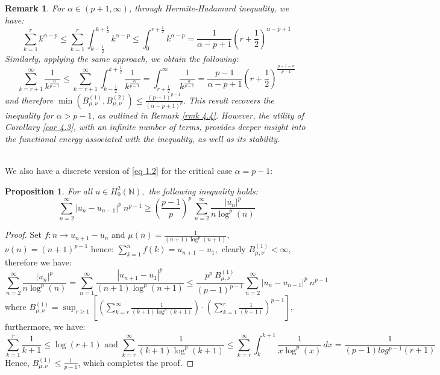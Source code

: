 \documentclass[11pt]{amsart}
\newtheorem{remark}[thm]{Remark}
\newtheorem{prop}[thm]{Proposition}
\newcommand{\1}{[1]}
\begin{document}
\begin{remark} \label{rmk 4.7} For $\alpha \in (p+1,\infty)$, through Hermite-Hadamard inequality, we have:
$$
\sum_{k=1}^{r} k^{\alpha-p} 
\leq \sum_{k=1}^{r} \int_{k-\frac{1}{2}}^{k+\frac{1}{2}} k^{\alpha-p}  \leq   \int_{0}^{r+\frac{1}{2}} k^{\alpha-p}  =  \frac{1} {\alpha-p+1}  \left(r+\frac{1}{2}\right)^{\alpha-p+1}$$
Similarly, applying the same approach, we obtain the following:
$$ \sum_{k=r+1}^{\infty} \frac{1}{k^{\frac{\alpha}{p-1}}} \leq  \sum_{k=r+1}^{\infty} \int_{k-\frac{1}{2}}^{k+\frac{1}{2}} \frac{1}{k^{\frac{\alpha}{p-1}}} = \int_{r+ \frac{1}{2}}^{\infty} \ \frac{1}{k^{\frac{\alpha}{p-1}}} = \frac{p-1}{\alpha-p+1} \left(r+\frac{1}{2}\right)^{\frac{p-1-\alpha}{p-1}} 
$$
and therefore $\min(B_{\mu,\nu}^{(1)},B_{\mu,\nu}^{(2)})  \leq \frac{(p-1)^{p-1}} {(\alpha-p+1)^p}.$ This result recovers the inequality for  \( \alpha > p - 1 \), as outlined in Remark \ref{rmk 4.4}. However, the utility of Corollary \ref{cor 4.3}, with an infinite number of terms, provides deeper insight into the functional energy associated with the inequality, as well as its stability.
\end{remark} 
\phantom{.} \\
We also have a discrete version of \ref{eq 1.2} for the critical case \( \alpha = p - 1 \):
\begin{prop} \label{prop 4.8} For all $u \in H_0^{2}(\mathbb{N}),$ the following inequality holds: 
$$\sum_{n=2}^{\infty} |u_{n}-u_{n-1}|^{p} \ n^{p-1}  \geq  \left( \frac{p-1}{p}\right)^{p} \, \sum_{n=2}^{\infty} \frac{|u_{n}|^{p}} {n \log^{p}(n)} $$
\end{prop}
\begin{proof} Set $f: n \to  u_{n+1}-u_{n}$ and $\displaystyle \mu(n)= \frac{1}{(n+1) \log^{p}(n+1)},$ $\nu(n)= (n+1)^{p-1}$ hence: $\displaystyle \sum_{k=1}^{n} f(k) = u_{n+1}-u_{1},$ clearly $B_{\mu,\nu}^{(1)} < \infty,$ therefore we have:
$$ \sum_{n=2}^{\infty}  \frac{|u_{n}|^{p} }{n\log^{p}(n)} = \sum_{n=1}^{\infty}  \frac{|u_{n+1}-u_{1}|^{p} }{(n+1) \log^{p}(n+1)} \leq 
\frac{p^{p} \ B_{\mu,\nu}^{(1)}}{(p-1)^{p-1}}  \sum_{n=2}^{\infty} |u_{n}-u_{n-1}|^{p} \ n^{p-1}  $$
where $ \displaystyle B_{\mu,\nu}^{(1)} = \sup_{r \geq 1} \left[ \left( \sum_{k=r}^{\infty} \frac{1}{(k+1) \log^{p}(k+1)} \right) \cdot \left( \sum_{k=1}^{r} \frac{1}{(k+1)} \right)^{p-1} \right],$ furthermore, we have:
$$
\sum_{k=1}^{r} \frac{1}{k+1} \leq 
 \log(r+1) \, \, \text{and} \, \,  \sum_{k=r}^{\infty} \frac{1}{(k+1) \log^{p}(k+1)} \leq  \sum_{k=r}^{\infty}  \int_{k}^{k+1} \frac{1}{x \log^{p}(x)} \, dx= \frac{1}{(p-1) log^{p-1}(r+1)}$$
Hence, \( B_{\mu,\nu}^{(1)} \leq \frac{1}{p-1} \),  which completes the proof.
\end{proof}
\end{document}
